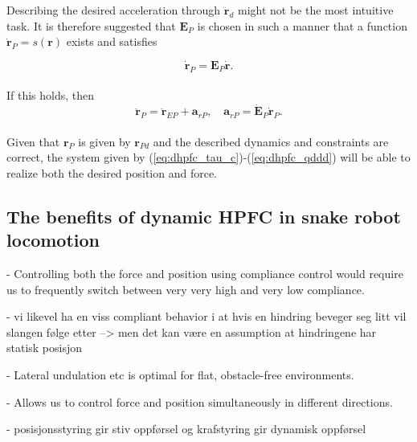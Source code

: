Describing the desired acceleration through $\mathbf{\ddot{r}}_d$ might not be the most intuitive task. It is therefore suggested that $\mathbf{E}_P$ is chosen in such a manner that a function $\mathbf{\dot{r}}_P = s(\mathbf{r})$ exists and satisfies

\begin{equation}
    \mathbf{\dot{r}}_P = \mathbf{E}_P \mathbf{\dot{r}}.
\end{equation}
\\
If this holds, then
\begin{equation}
    \mathbf{\ddot{r}}_P = \mathbf{\ddot{r}}_{EP} + \mathbf{a}_{rP}, \quad \mathbf{a}_{rP} = \mathbf{\dot{E}}_P \mathbf{\dot{r}}_P.
\end{equation}
\\
Given that $\mathbf{r}_{P}$ is given by $\mathbf{r}_{Pd}$ and the described dynamics and constraints are correct, the system given by (\ref{eq:dhpfc_tau_c})-(\ref{eq:dhpfc_qddd}) will be able to realize both the desired position and force.


\subsection{The benefits of dynamic HPFC in snake robot locomotion}

- Controlling both the force and position using compliance control would require us to frequently switch between very very high and very low compliance.

- vi likevel ha en viss compliant behavior i at hvis en hindring beveger seg litt vil slangen følge etter --> men det kan være en assumption at hindringene har statisk posisjon

- Lateral undulation etc is optimal for flat, obstacle-free environments.

- Allows us to control force and position simultaneously in different directions.

- posisjonsstyring gir stiv oppførsel og krafstyring gir dynamisk oppførsel


